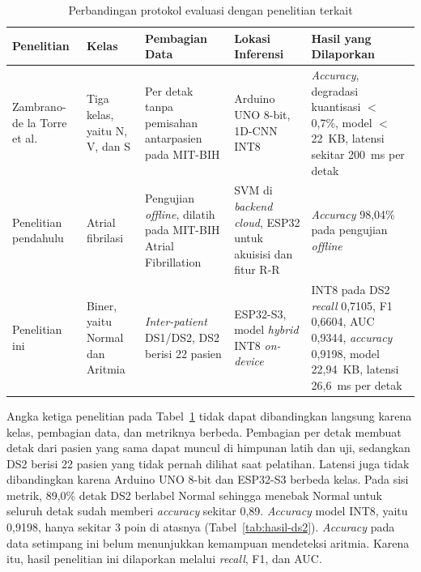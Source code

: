 \begin{table}[!ht]
  \centering
  \caption{Perbandingan protokol evaluasi dengan penelitian terkait}
  \label{tab:perbandingan-protokol}
  \setlength{\tabcolsep}{3pt}
  \renewcommand{\arraystretch}{1.15}
  \small
  \begin{tabular}{>{\RaggedRight\arraybackslash}p{2.35cm}>{\RaggedRight\arraybackslash}p{2.0cm}>{\RaggedRight\arraybackslash}p{2.5cm}>{\RaggedRight\arraybackslash}p{2.4cm}>{\RaggedRight\arraybackslash}p{3.45cm}}
    \toprule
    \textbf{Penelitian} & \textbf{Kelas} & \textbf{Pembagian Data} & \textbf{Lokasi Inferensi} & \textbf{Hasil yang Dilaporkan} \\
    \midrule
    Zambrano-de la Torre et al.~\cite{zambrano_2026} &
    Tiga kelas, yaitu N, V, dan S &
    Per detak tanpa pemisahan antarpasien pada MIT-BIH &
    Arduino UNO 8-bit, 1D-CNN INT8 &
    \textit{Accuracy}, degradasi kuantisasi $<$ 0,7\%, model $<$ 22~KB, latensi sekitar 200~ms per detak \\
    Penelitian pendahulu~\cite{mulyawan_2026} &
    Atrial fibrilasi &
    Pengujian \textit{offline}, dilatih pada MIT-BIH Atrial Fibrillation &
    SVM di \textit{backend cloud}, ESP32 untuk akuisisi dan fitur R-R &
    \textit{Accuracy} 98,04\% pada pengujian \textit{offline} \\
    Penelitian ini &
    Biner, yaitu Normal dan Aritmia &
    \textit{Inter-patient} DS1/DS2, DS2 berisi 22 pasien &
    ESP32-S3, model \textit{hybrid} INT8 \textit{on-device} &
    INT8 pada DS2 \textit{recall} 0,7105, F1 0,6604, AUC 0,9344, \textit{accuracy} 0,9198, model 22,94~KB, latensi 26,6~ms per detak \\
    \bottomrule
  \end{tabular}
\end{table}

Angka ketiga penelitian pada Tabel~\ref{tab:perbandingan-protokol} tidak dapat dibandingkan langsung karena kelas, pembagian data, dan metriknya berbeda. Pembagian per detak membuat detak dari pasien yang sama dapat muncul di himpunan latih dan uji, sedangkan DS2 berisi 22 pasien yang tidak pernah dilihat saat pelatihan. Latensi juga tidak dibandingkan karena Arduino UNO 8-bit dan ESP32-S3 berbeda kelas. Pada sisi metrik, 89,0\% detak DS2 berlabel Normal sehingga menebak Normal untuk seluruh detak sudah memberi \textit{accuracy} sekitar 0,89. \textit{Accuracy} model INT8, yaitu 0,9198, hanya sekitar 3 poin di atasnya (Tabel~\ref{tab:hasil-ds2}). \textit{Accuracy} pada data setimpang ini belum menunjukkan kemampuan mendeteksi aritmia. Karena itu, hasil penelitian ini dilaporkan melalui \textit{recall}, F1, dan AUC.

